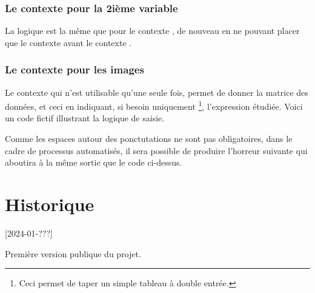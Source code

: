 
\subsubsection{Le contexte  pour la 2ième variable}

La logique est la même que pour le contexte , de nouveau en ne pouvant placer que le contexte  avant le contexte .



\subsubsection{Le contexte  pour les images}

Le contexte  qui n'est utilisable qu'une seule fois, permet de donner la matrice des données, et ceci en indiquant, si besoin uniquement
\footnote{
	Ceci permet de taper un simple tableau à double entrée.
},
l'expression étudiée.
Voici un code fictif illustrant la logique de saisie.




Comme les espaces autour des ponctutations ne sont pas obligatoires, dans le cadre de processus automatisés, il sera possible de produire l'horreur suivante qui aboutira à la même sortie que le code ci-dessus.

\section{Historique}

[2024-01-???]

Première version publique du projet.


